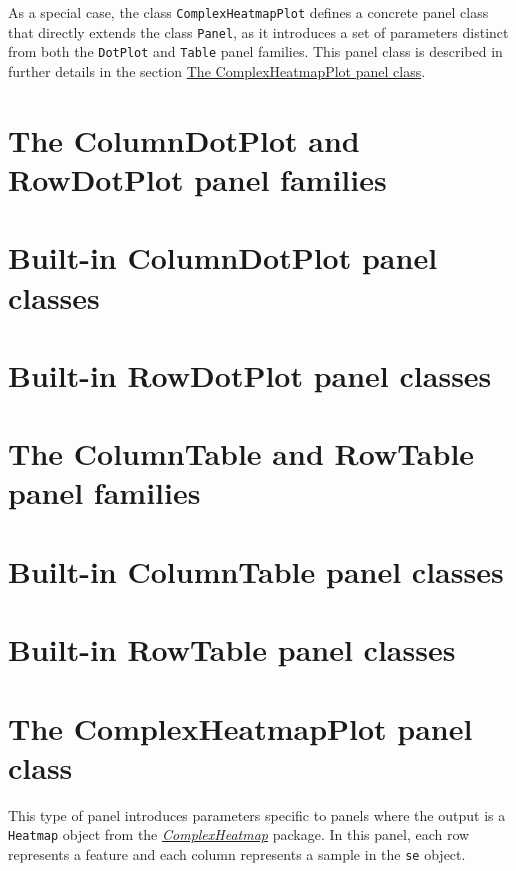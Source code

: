 \documentclass[]{book}
\begin{document}
As a special case, the class \texttt{ComplexHeatmapPlot} defines a
concrete panel class that directly extends the class \texttt{Panel}, as
it introduces a set of parameters distinct from both the
\texttt{DotPlot} and \texttt{Table} panel families. This panel class is
described in further details in the section
\protect\hyperlink{complexheatmapplot-class}{The ComplexHeatmapPlot
panel class}.

\section{The ColumnDotPlot and RowDotPlot panel
families}\label{the-columndotplot-and-rowdotplot-panel-families}

\section{Built-in ColumnDotPlot panel
classes}\label{built-in-columndotplot-panel-classes}

\section{Built-in RowDotPlot panel
classes}\label{built-in-rowdotplot-panel-classes}

\section{The ColumnTable and RowTable panel
families}\label{the-columntable-and-rowtable-panel-families}

\section{Built-in ColumnTable panel
classes}\label{built-in-columntable-panel-classes}

\section{Built-in RowTable panel
classes}\label{built-in-rowtable-panel-classes}

\hypertarget{complexheatmapplot-class}{\section{The ComplexHeatmapPlot
panel class}\label{complexheatmapplot-class}}

This type of panel introduces parameters specific to panels where the
output is a \texttt{Heatmap} object from the
\emph{\href{https://bioconductor.org/packages/3.11/ComplexHeatmap}{ComplexHeatmap}}
package. In this panel, each row represents a feature and each column
represents a sample in the \texttt{se} object.
\end{document}
